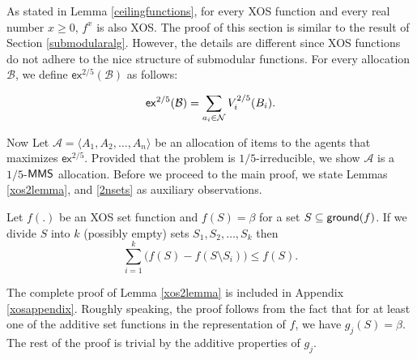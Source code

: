 As stated in Lemma \ref{ceilingfunctions}, for every XOS function and every real number $x \geq 0$, $f^x$ is also XOS. The proof of this section is similar to the result of Section \ref{submodularalg}. However, the details are different since XOS functions do not adhere to the nice structure of submodular functions. For every allocation $\mathcal{B}$, we define $\mathsf{ex}^{2/5}(\mathcal{B})$ as follows:
 
$$\mathsf{ex}^{2/5}(\mathcal{B}) = \sum_{a_i \in \mathcal{N}} V_i^{2/5}(B_i).$$

Now Let $\mathcal{A} = \langle A_1, A_2, \ldots, A_n\rangle$ be an allocation of items to the agents that maximizes $\mathsf{ex}^{2/5}$. Provided that the problem is $1/5$-irreducible, we show $\mathcal{A}$ is a $1/5$-$\mathsf{MMS}$ allocation. Before we proceed to the main proof, we state Lemmas  \ref{xos2lemma}, and \ref{2nsets} as auxiliary observations. 

\begin{lemma}\label{xos2lemma}
Let $f(.)$ be an XOS set function and  $f(S) = \beta$ for a set $S \subseteq \mathsf{ground}(f)$. If we divide $S$ into $k$ (possibly empty)  sets $S_1, S_2, \ldots, S_k$ then 
$$\sum_{i=1}^k \Big(f(S) - f(S\setminus S_i)\Big) \leq f(S).$$
\end{lemma}
The complete proof of Lemma \ref{xos2lemma} is included in Appendix \ref{xosappendix}. Roughly speaking, the proof follows from the fact that for at least one of the additive set functions in the representation of $f$, we have $g_j(S) = \beta$. The rest of the proof is trivial by the additive properties of $g_j$.

